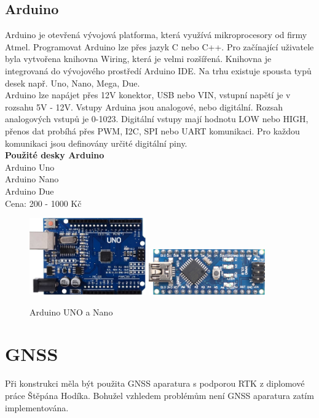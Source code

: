 \subsection{Arduino} 
Arduino je otevřená vývojová platforma, která využívá mikroprocesory od firmy Atmel. Programovat Arduino lze přes jazyk C nebo C++. Pro začínající uživatele byla vytvořena knihovna Wiring, která je velmi rozšířená. Knihovna je integrovaná do vývojového prostředí Arduino IDE. Na trhu existuje spousta typů desek např. Uno, Nano, Mega, Due. \\
Arduino lze napájet přes 12V konektor, USB nebo VIN, vstupní napětí je v rozsahu 5V - 12V. Vstupy Arduina jsou analogové, nebo digitální. Rozsah analogových vstupů je 0-1023. Digitální vstupy mají hodnotu LOW nebo HIGH, přenos dat probíhá přes PWM, I2C, SPI nebo UART komunikaci. Pro každou komunikaci jsou definovány určité digitální piny.\\

\textbf{Použité desky Arduino}\\
Arduino Uno\\
Arduino Nano\\
Arduino Due\\
Cena: 200 - 1000 Kč\\

\begin{figure}[H]
	\centering
	\includegraphics[width=5cm]{pictures/uno.jpg}
	\includegraphics[width=5cm]{pictures/nano.jpg}
	\caption{Arduino UNO a Nano}
\end{figure}

\section{GNSS}
Při konstrukci měla být použita GNSS aparatura s podporou RTK z diplomové práce Štěpána Hodíka. Bohužel vzhledem problémům není GNSS aparatura zatím implementována.


